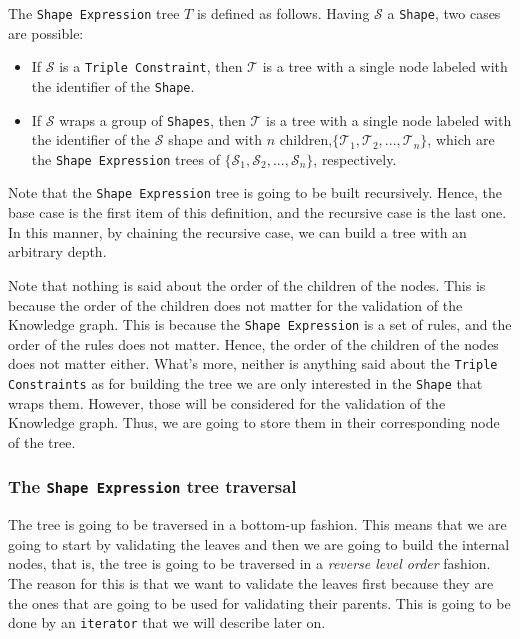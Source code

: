 \begin{definition}
    The \texttt{Shape Expression} tree $T$ is defined as follows. Having $\mathcal{S}$ a \texttt{Shape}, two cases are possible:

    \begin{itemize}
        \itemsep0.5em
        \item If $\mathcal{S}$ is a \texttt{Triple Constraint}, then $\mathcal{T}$ is a tree with a single node labeled with the identifier of the \texttt{Shape}.
        \item If $\mathcal{S}$ wraps a group of \texttt{Shapes}, then $\mathcal{T}$ is a tree with a single node labeled with the identifier of the $\mathcal{S}$ shape and with $n$ children,$\{\mathcal{T}_1, \mathcal{T}_2, ..., \mathcal{T}_n\}$, which are the \texttt{Shape Expression} trees of $\{\mathcal{S}_1, \mathcal{S}_2, ..., \mathcal{S}_n\}$, respectively.
    \end{itemize}

    Note that the \texttt{Shape Expression} tree is going to be built recursively. Hence, the base case is the first item of this definition, and the recursive case is the last one. In this manner, by chaining the recursive case, we can build a tree with an arbitrary depth.
\end{definition}

\begin{example}

\end{example}

Note that nothing is said about the order of the children of the nodes. This is because the order of the children does not matter for the validation of the Knowledge graph. This is because the \texttt{Shape Expression} is a set of rules, and the order of the rules does not matter. Hence, the order of the children of the nodes does not matter either. What's more, neither is anything said about the \texttt{Triple Constraints} as for building the tree we are only interested in the \texttt{Shape} that wraps them. However, those will be considered for the validation of the Knowledge graph. Thus, we are going to store them in their corresponding node of the tree.

\subsubsection{The \texttt{Shape Expression} tree traversal}

The tree is going to be traversed in a bottom-up fashion. This means that we are going to start by validating the leaves and then we are going to build the internal nodes, that is, the tree is going to be traversed in a \textit{reverse level order} fashion. The reason for this is that we want to validate the leaves first because they are the ones that are going to be used for validating their parents. This is going to be done by an \texttt{iterator} that we will describe later on.

